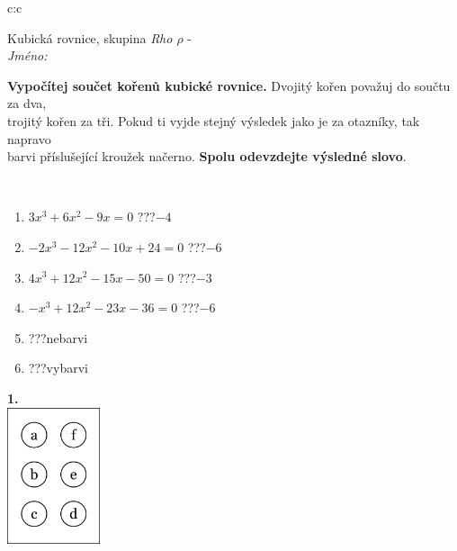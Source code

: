 \documentclass[10pt]{report}
\begin{document}
\begin{tabular}{c:c}
\begin{minipage}[c][104.5mm][t]{0.5\linewidth}
\begin{center}
\vspace{7mm}
{\huge Kubická rovnice, skupina \textit{Rho $\rho$} -}\\[5mm]
\textit{Jméno:}\phantom{xxxxxxxxxxxxxxxxxxxxxxxxxxxxxxxxxxxxxxxxxxxxxxxxxxxxxxxxxxxxxxxxx}\\[5mm]
\begin{minipage}{0.95\linewidth}
\begin{center}
\textbf{Vypočítej součet kořenů kubické rovnice.} Dvojitý kořen považuj do součtu za dva,\\trojitý kořen za tři. Pokud ti vyjde stejný výsledek jako je za otazníky, tak napravo\\barvi příslušející kroužek načerno. \textbf{Spolu odevzdejte výsledné slovo}.
\end{center}
\end{minipage}
\\[1mm]
\begin{minipage}{0.79\linewidth}
\begin{center}
\begin{varwidth}{\linewidth}
\begin{enumerate}
\Large
\item $3x^3+6x^2-9x=0$\quad \dotfill\; ???\;\dotfill \quad $-4$
\item $-2x^3-12x^2-10x+24=0$\quad \dotfill\; ???\;\dotfill \quad $-6$
\item $4x^3+12x^2-15x-50=0$\quad \dotfill\; ???\;\dotfill \quad $-3$
\item $-x^3+12x^2-23x-36=0$\quad \dotfill\; ???\;\dotfill \quad $-6$
\item \quad \dotfill\; ???\;\dotfill \quad nebarvi
\item \quad \dotfill\; ???\;\dotfill \quad vybarvi
\end{enumerate}
\end{varwidth}
\end{center}
\end{minipage}
\begin{minipage}{0.20\linewidth}
\begin{center}
{\Huge\bfseries 1.} \\[2mm]
\includegraphics[height=40mm]{../images/braille.png}

\end{center}
\end{minipage}
\end{center}
\end{minipage}
\end{tabular}
\end{document}
